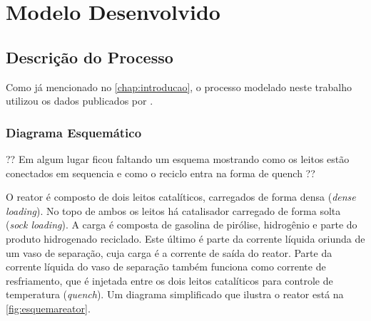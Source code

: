 %
\chapter{Modelo Desenvolvido}
\label{chap:moddesenvolvidos}

\section{Descrição do Processo} \label{sec:descricaoprocesso}

Como já mencionado no \autoref{chap:introducao}, o processo modelado
neste trabalho utilizou os dados publicados por . 

\subsection{Diagrama Esquemático} \label{sec:diagramaesquematico}

?? Em algum lugar ficou faltando um esquema mostrando como os leitos estão
conectados em sequencia e como o reciclo entra na forma de quench ??

O reator é composto de dois leitos catalíticos, carregados de forma
densa (\emph{dense loading}). No topo de ambos os leitos há catalisador carregado de
forma solta (\emph{sock loading}). A carga é composta de gasolina de pirólise,
hidrogênio e parte do produto hidrogenado reciclado. Este último é parte da
corrente líquida oriunda de um vaso de separação, cuja carga é a corrente de
saída do reator. Parte da corrente líquida do vaso de separação também funciona
como corrente de resfriamento, que é injetada entre os dois leitos catalíticos
para controle de temperatura (\emph{quench}). Um diagrama simplificado que
ilustra o reator está na \autoref{fig:esquemareator}.

